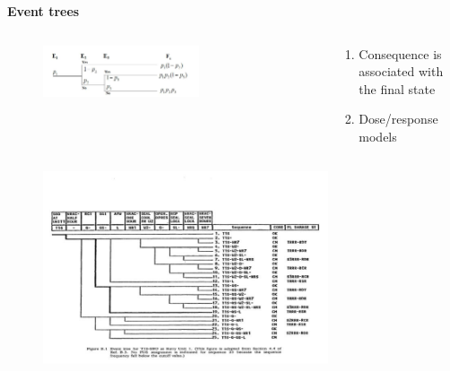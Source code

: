 \documentclass[aspectratio=1610,pdftex,dvipsnames,compress,xcolor={dvipsnames}]{beamer}
\begin{document}
\begin{frame}[plain]{}
    \centering\LARGE\textbf{Event trees}
\end{frame}


\addtocounter{framenumber}{-1}
\begin{frame}{}
    \begin{columns}[c]

        \begin{column}{0.65\textwidth}
            \begin{figure}
                \centering
                \includegraphics[width=0.65\textwidth]{event.tree.jpg}
            \end{figure}
        \end{column}

        \begin{column}{0.35\textwidth}
            \begin{enumerate}[series=outerlist,topsep=0pt,itemsep=21pt,leftmargin=*,label=(\arabic*)]
                \item[]Consequence is associated with the final state
                \item[]Dose/response models
            \end{enumerate}
        \end{column}

    \end{columns}
\end{frame}


\begin{frame}{}
    \begin{figure}
        \centering
        \includegraphics[width=0.75\textwidth]{event.tree.wash.jpg}
    \end{figure}
\end{frame}
\end{document}
